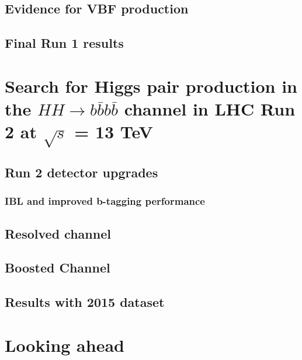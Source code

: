 \documentclass{Dissertate}
\begin{document}
\chapter{Evidence for VBF production}

\chapter{Final Run 1 results}

\part{Search for Higgs pair production in the $HH\rightarrow
  b\bar{b}b\bar{b}$ channel in LHC Run 2 at $\sqrt{s}$ = 13 TeV}

\chapter{Run 2 detector upgrades}

\section{IBL and improved b-tagging performance}

\chapter{Resolved channel}

\chapter{Boosted Channel}

\chapter{Results with 2015 dataset}

\part{Looking ahead}

\begin{appendices}
    
\end{appendices}


\clearpage




\end{document}
